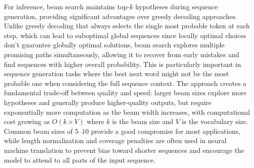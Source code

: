For inference, beam search maintains top-$k$ hypotheses during sequence generation, providing significant advantages over greedy decoding approaches. Unlike greedy decoding that always selects the single most probable token at each step, which can lead to suboptimal global sequences since locally optimal choices don't guarantee globally optimal solutions, beam search explores multiple promising paths simultaneously, allowing it to recover from early mistakes and find sequences with higher overall probability. This is particularly important in sequence generation tasks where the best next word might not be the most probable one when considering the full sequence context. The approach creates a fundamental trade-off between quality and speed: larger beam sizes explore more hypotheses and generally produce higher-quality outputs, but require exponentially more computation as the beam width increases, with computational cost growing as $O(k \times V)$ where $k$ is the beam size and $V$ is the vocabulary size. Common beam sizes of 5–10 provide a good compromise for most applications, while length normalization and coverage penalties are often used in neural machine translation to prevent bias toward shorter sequences and encourage the model to attend to all parts of the input sequence.
